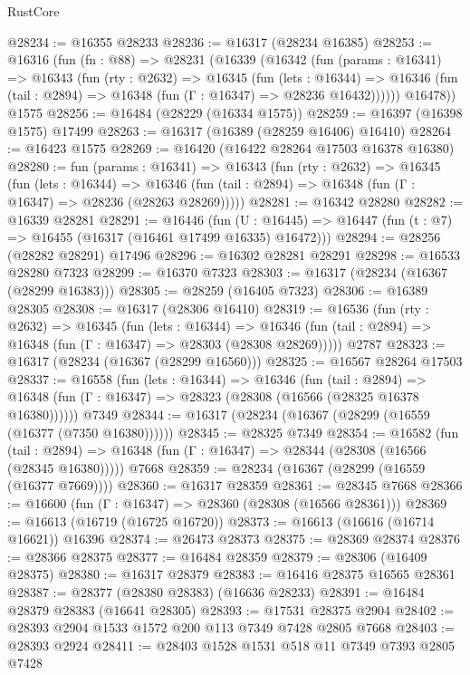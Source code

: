 \begin{lexlean}{RustCore}
\begin{coremodule}
@28234 := @16355 @28233
@28236 := @16317 (@28234 @16385)
@28253 := @16316
    (fun (fn : @88) =>
    @28231
      (@16339
        (@16342
          (fun (params : @16341) =>
          @16343
            (fun (rty : @2632) =>
            @16345
              (fun (lets : @16344) =>
              @16346 (fun (tail : @2894) => @16348 (fun (Γ : @16347) => @28236 @16432))))))
        @16478))
    @1575
@28256 := @16484 (@28229 (@16334 @1575))
@28259 := @16397 (@16398 @1575) @17499
@28263 := @16317 (@16389 (@28259 @16406) @16410)
@28264 := @16423 @1575
@28269 := @16420 (@16422 @28264 @17503 @16378 @16380)
@28280 := fun (params : @16341) =>
  @16343
    (fun (rty : @2632) =>
    @16345
      (fun (lets : @16344) =>
      @16346 (fun (tail : @2894) => @16348 (fun (Γ : @16347) => @28236 (@28263 @28269)))))
@28281 := @16342 @28280
@28282 := @16339 @28281
@28291 := @16446
    (fun (U : @16445) => @16447 (fun (t : @7) => @16455 (@16317 (@16461 @17499 @16335) @16472)))
@28294 := @28256 (@28282 @28291) @17496
@28296 := @16302 @28281 @28291
@28298 := @16533 @28280 @7323
@28299 := @16370 @7323
@28303 := @16317 (@28234 (@16367 (@28299 @16383)))
@28305 := @28259 (@16405 @7323)
@28306 := @16389 @28305
@28308 := @16317 (@28306 @16410)
@28319 := @16536
    (fun (rty : @2632) =>
    @16345
      (fun (lets : @16344) =>
      @16346 (fun (tail : @2894) => @16348 (fun (Γ : @16347) => @28303 (@28308 @28269)))))
    @2787
@28323 := @16317 (@28234 (@16367 (@28299 @16560)))
@28325 := @16567 @28264 @17503
@28337 := @16558
    (fun (lets : @16344) =>
    @16346
      (fun (tail : @2894) =>
      @16348 (fun (Γ : @16347) => @28323 (@28308 (@16566 (@28325 @16378 @16380))))))
    @7349
@28344 := @16317 (@28234 (@16367 (@28299 (@16559 (@16377 (@7350 @16380))))))
@28345 := @28325 @7349
@28354 := @16582
    (fun (tail : @2894) => @16348 (fun (Γ : @16347) => @28344 (@28308 (@16566 (@28345 @16380)))))
    @7668
@28359 := @28234 (@16367 (@28299 (@16559 (@16377 @7669))))
@28360 := @16317 @28359
@28361 := @28345 @7668
@28366 := @16600 (fun (Γ : @16347) => @28360 (@28308 (@16566 @28361)))
@28369 := @16613 (@16719 (@16725 @16720))
@28373 := @16613 (@16616 (@16714 @16621)) @16396
@28374 := @26473 @28373
@28375 := @28369 @28374
@28376 := @28366 @28375
@28377 := @16484 @28359
@28379 := @28306 (@16409 @28375)
@28380 := @16317 @28379
@28383 := @16416 @28375 @16565 @28361
@28387 := @28377 (@28380 @28383) (@16636 @28233)
@28391 := @16484 @28379 @28383 (@16641 @28305)
@28393 := @17531 @28375 @2904
@28402 := @28393 @2904 @1533 @1572 @200 @113 @7349 @7428 @2805 @7668
@28403 := @28393 @2924
@28411 := @28403 @1528 @1531 @518 @11 @7349 @7393 @2805 @7428

\end{coremodule}
\end{lexlean}
